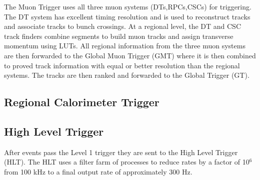 The Muon Trigger uses all three muon systems (DTs,RPCs,CSCs) for triggering.
The DT system has excellent timing resolution and is used to reconstruct tracks
and associate tracks to bunch crossings. At a regional level, the DT and CSC track finders
combine segments to build muon tracks and assign transverse momentum using
LUTs. All regional information from the three muon systems are then forwarded
to the Global Muon Trigger (GMT) where it is then combined to proved track
information with equal or better resolution than the regional systems. The tracks
are then ranked and forwarded to the Global Trigger (GT).
  \subsection{Regional Calorimeter Trigger}
  \subsection{High Level Trigger}
After events pass the Level 1 trigger they are sent to the High Level Trigger (HLT). The
HLT uses a filter farm of processes to reduce rates by a factor of 10$^{6}$ from 
100 kHz to a final output rate of approximately 300 Hz. 